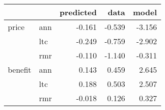 \begin{tabular}{llrrr}
\toprule
        &     &  predicted &   data &  model \\
\midrule
price & ann &     -0.161 & -0.539 & -3.156 \\
        & ltc &     -0.249 & -0.759 & -2.902 \\
        & rmr &     -0.110 & -1.140 & -0.311 \\
benefit & ann &      0.143 &  0.459 &  2.645 \\
        & ltc &      0.188 &  0.503 &  2.507 \\
        & rmr &     -0.018 &  0.126 &  0.327 \\
\bottomrule
\end{tabular}
